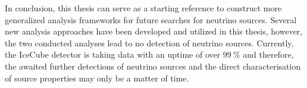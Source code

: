 In conclusion, this thesis can serve as a starting reference to construct more generalized analysis frameworks for future searches for neutrino sources.
Several new analysis approaches have been developed and utilized in this thesis, however, the two conducted analyses lead to no detection of neutrino sources.
Currently, the IceCube detector is taking data with an uptime of over $\SI{99}{\percent}$ and therefore, the awaited further detections of neutrino sources and the direct characterisation of source properties may only be a matter of time.
